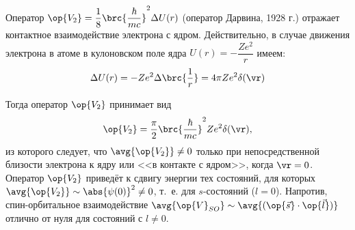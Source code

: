 Оператор $\op{V_2} = \dfrac{1}{8} \brc{\dfrac{\hbar}{mc}}^2\Delta U(r)$ (оператор Дарвина, 1928 г.) отражает контактное взаимодействие электрона с ядром. Действительно, в случае движения электрона в атоме в кулоновском поле ядра $U(r)  = -\dfrac{Ze^2}{r}$ имеем:
$$
\Delta U(r) = -Ze^2 \Delta \brc{\frac{1}{r}} = 4 \pi Ze^2 \delta(\vr)
$$

Тогда оператор $\op{V_2}$ принимает вид
$$
\op{V_2} = \frac{\pi}{2} \brc{\frac{\hbar}{mc}}^2 Ze^2 \delta(\vr),
$$
из которого следует, что $\avg{\op{V_2}} \neq 0$ только при непосредственной близости электрона к ядру или <<в контакте с ядром>>, когда $\vr = 0$. Оператор $\op{V_2}$ приведёт к сдвигу энергии тех состояний, для которых $\avg{\op{V_2}} \sim \abs{\psi(0)}^2 \neq 0$, т.~е. для $s$-состояний ($l=0$). Напротив, спин-орбитальное взаимодействие $\avg{\op{V}_{SO}} \sim \avg{(\op{\vec{s}} \cdot \op{\vec{l}})}$ отлично от нуля для состояний с $l \neq 0$.